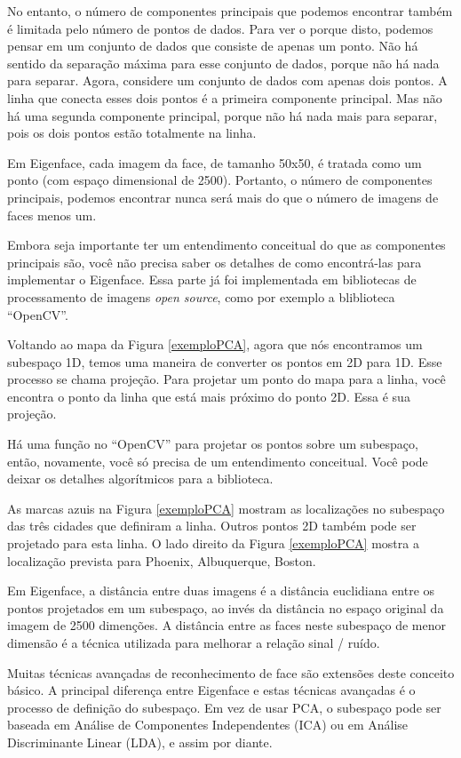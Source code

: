 No entanto, o número de componentes principais que podemos encontrar também é limitada pelo número de pontos de dados. Para ver o porque disto, podemos pensar em um conjunto de dados que consiste de apenas um ponto. Não há sentido da separação máxima para esse conjunto de dados, porque não há nada para separar. Agora, considere um conjunto de dados com apenas dois pontos. A linha que conecta esses dois pontos é a primeira componente principal. Mas não há uma segunda componente principal, porque não há nada mais para separar, pois os dois pontos estão totalmente na linha.

Em Eigenface, cada imagem da face, de tamanho 50x50, é tratada como um ponto (com espaço dimensional de 2500). Portanto, o número de componentes principais, podemos encontrar nunca será mais do que o número de imagens de faces menos um.

Embora seja importante ter um entendimento conceitual do que as componentes principais são, você não precisa saber os detalhes de como encontrá-las para implementar o Eigenface. Essa parte já foi implementada em bibliotecas de processamento de imagens \textit{open source}, como por exemplo a bliblioteca ``OpenCV''.

Voltando ao mapa da Figura \ref{exemploPCA}, agora que nós encontramos um subespaço 1D, temos uma maneira de converter os pontos em 2D para 1D. Esse processo se chama projeção. Para projetar um ponto do mapa para a linha, você encontra o ponto da linha que está mais próximo do ponto 2D. Essa é sua projeção.

Há uma função no ``OpenCV'' para projetar os pontos sobre um subespaço, então, novamente, você só precisa de um entendimento conceitual. Você pode deixar os detalhes algorítmicos para a biblioteca.

As marcas azuis na Figura \ref{exemploPCA} mostram as localizações no subespaço das três cidades que definiram a linha. Outros pontos 2D também pode ser projetado para esta linha. O lado direito da Figura \ref{exemploPCA} mostra a localização prevista para Phoenix, Albuquerque, Boston.

Em Eigenface, a distância entre duas imagens é a distância euclidiana entre os pontos projetados em um subespaço, ao invés da distância no espaço original da imagem de 2500 dimenções. A distância entre as faces neste subespaço de menor dimensão é a técnica utilizada para melhorar a relação sinal / ruído.

Muitas técnicas avançadas de reconhecimento de face são extensões deste conceito básico. A principal diferença entre Eigenface e estas técnicas avançadas é o processo de definição do subespaço. Em vez de usar PCA, o subespaço pode ser baseada em Análise de Componentes Independentes (ICA) ou em Análise Discriminante Linear (LDA), e assim por diante.

